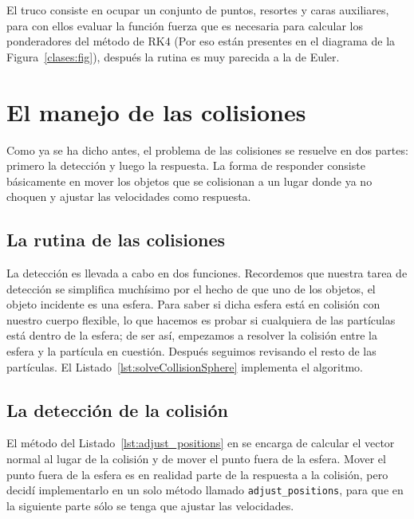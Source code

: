 
El truco consiste en ocupar un conjunto de puntos, resortes y caras auxiliares, para con ellos evaluar la función fuerza que es necesaria para calcular los ponderadores del método de RK4 (Por eso están presentes en el diagrama de la Figura~\ref{clases:fig}), después la rutina es muy parecida a la de Euler.

\section{El manejo de las colisiones}
Como ya se ha dicho antes, el problema de las colisiones se resuelve en dos partes: primero la detección y luego la respuesta.
La forma de responder consiste básicamente en mover los objetos que se colisionan a un lugar donde ya no choquen y ajustar las velocidades como respuesta.

\subsection{La rutina de las colisiones}
La detección es llevada a cabo en dos funciones.
Recordemos que nuestra tarea de detección se simplifica muchísimo por el hecho de que uno de los objetos, el objeto incidente es una esfera.
Para saber si dicha esfera está en colisión con nuestro cuerpo flexible, lo que hacemos es probar si cualquiera de las partículas está dentro de la esfera; de ser así, empezamos a resolver la colisión entre la esfera y la partícula en cuestión. Después seguimos revisando el resto de las partículas.
El Listado~\ref{lst:solveCollisionSphere} implementa el algoritmo.


\subsection{La detección de la colisión}
El método del Listado~\ref{lst:adjust_positions} en se encarga de calcular el vector normal al lugar de la colisión y de mover el punto fuera de la esfera.
Mover el punto fuera de la esfera es en realidad parte de la respuesta a la colisión, pero decidí implementarlo en un solo método llamado \texttt{adjust_positions}, para que en la siguiente parte sólo se tenga que ajustar las velocidades.


